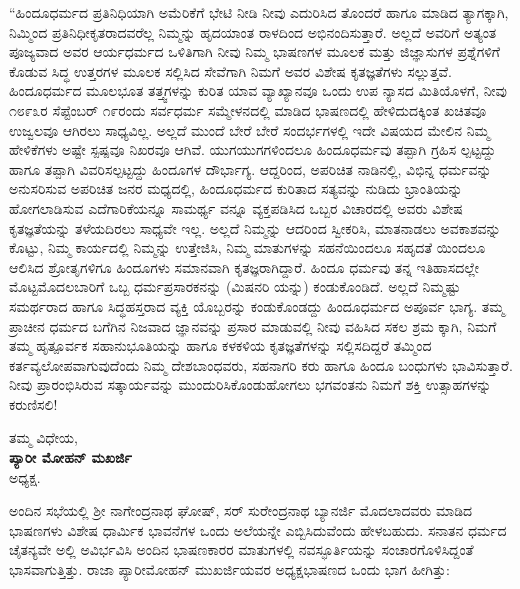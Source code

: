 “ಹಿಂದೂಧರ್ಮದ ಪ್ರತಿನಿಧಿಯಾಗಿ ಅಮೆರಿಕೆಗೆ ಭೇಟಿ ನೀಡಿ ನೀವು ಎದುರಿಸಿದ ತೊಂದರೆ ಹಾಗೂ ಮಾಡಿದ ತ್ಯಾಗಕ್ಕಾಗಿ, ನಿಮ್ಮಿಂದ ಪ್ರತಿನಿಧೀಕೃತರಾದವರೆಲ್ಲ ನಿಮ್ಮನ್ನು ಹೃದಯಾಂತ ರಾಳದಿಂದ ಅಭಿನಂದಿಸುತ್ತಾರೆ. ಅಲ್ಲದೆ ಅವರಿಗೆ ಅತ್ಯಂತ ಪೂಜ್ಯವಾದ ಅವರ ಆರ್ಯಧರ್ಮದ ಒಳಿತಿಗಾಗಿ ನೀವು ನಿಮ್ಮ ಭಾಷಣಗಳ ಮೂಲಕ ಮತ್ತು ಜಿಜ್ಞಾಸುಗಳ ಪ್ರಶ್ನೆಗಳಿಗೆ ಕೊಡುವ ಸಿದ್ಧ ಉತ್ತರಗಳ ಮೂಲಕ ಸಲ್ಲಿಸಿದ ಸೇವೆಗಾಗಿ ನಿಮಗೆ ಅವರ ವಿಶೇಷ ಕೃತಜ್ಞತೆಗಳು ಸಲ್ಲುತ್ತವೆ. ಹಿಂದೂಧರ್ಮದ ಮೂಲಭೂತ ತತ್ತ್ವಗಳನ್ನು ಕುರಿತ ಯಾವ ವ್ಯಾಖ್ಯಾನವೂ ಒಂದು ಉಪ ನ್ಯಾಸದ ಮಿತಿಯೊಳಗೆ, ನೀವು ೧೮೯೩ರ ಸೆಪ್ಟೆಂಬರ್ ೧೯ರಂದು ಸರ್ವಧರ್ಮ ಸಮ್ಮೇಳನದಲ್ಲಿ ಮಾಡಿದ ಭಾಷಣದಲ್ಲಿ ಹೇಳಿದುದಕ್ಕಿಂತ ಖಚಿತವೂ ಉಜ್ವಲವೂ ಆಗಿರಲು ಸಾಧ್ಯವಿಲ್ಲ. ಅಲ್ಲದೆ ಮುಂದೆ ಬೇರೆ ಬೇರೆ ಸಂದರ್ಭಗಳಲ್ಲಿ ಇದೇ ವಿಷಯದ ಮೇಲಿನ ನಿಮ್ಮ ಹೇಳಿಕೆಗಳು ಅಷ್ಟೇ ಸ್ಪಷ್ಪವೂ ನಿಖರವೂ ಆಗಿವೆ. ಯುಗಯುಗಗಳಿಂದಲೂ ಹಿಂದೂಧರ್ಮವು ತಪ್ಪಾಗಿ ಗ್ರಹಿಸ ಲ್ಪಟ್ಟದ್ದು ಹಾಗೂ ತಪ್ಪಾಗಿ ವಿವರಿಸಲ್ಪಟ್ಟದ್ದು ಹಿಂದೂಗಳ ದೌರ್ಭಾಗ್ಯ. ಆದ್ದರಿಂದ, ಅಪರಿಚಿತ ನಾಡಿನಲ್ಲಿ, ವಿಭಿನ್ನ ಧರ್ಮವನ್ನು ಅನುಸರಿಸುವ ಅಪರಿಚಿತ ಜನರ ಮಧ್ಯದಲ್ಲಿ, ಹಿಂದೂಧರ್ಮದ ಕುರಿತಾದ ಸತ್ಯವನ್ನು ನುಡಿದು ಭ್ರಾಂತಿಯನ್ನು ಹೋಗಲಾಡಿಸುವ ಎದೆಗಾರಿಕೆಯನ್ನೂ ಸಾಮರ್ಥ್ಯ ವನ್ನೂ ವ್ಯಕ್ತಪಡಿಸಿದ ಒಬ್ಬರ ವಿಚಾರದಲ್ಲಿ ಅವರು ವಿಶೇಷ ಕೃತಜ್ಞತೆಯನ್ನು ತಳೆಯದಿರಲು ಸಾಧ್ಯವೇ ಇಲ್ಲ. ಅಲ್ಲದೆ ನಿಮ್ಮನ್ನು ಆದರಿಂದ ಸ್ವೀಕರಿಸಿ, ಮಾತನಾಡಲು ಅವಕಾಶವನ್ನು ಕೊಟ್ಟು, ನಿಮ್ಮ ಕಾರ್ಯದಲ್ಲಿ ನಿಮ್ಮನ್ನು ಉತ್ತೇಜಿಸಿ, ನಿಮ್ಮ ಮಾತುಗಳನ್ನು ಸಹನೆಯಿಂದಲೂ ಸಹೃದತೆ ಯಿಂದಲೂ ಆಲಿಸಿದ ಶ್ರೋತೃಗಳಿಗೂ ಹಿಂದೂಗಳು ಸಮಾನವಾಗಿ ಕೃತಜ್ಞರಾಗಿದ್ದಾರೆ. ಹಿಂದೂ ಧರ್ಮವು ತನ್ನ ಇತಿಹಾಸದಲ್ಲೇ ಮೊಟ್ಟಮೊದಲಬಾರಿಗೆ ಒಬ್ಬ ಧರ್ಮಪ್ರಸಾರಕನನ್ನು (ಮಿಷನರಿ ಯನ್ನು) ಕಂಡುಕೊಂಡಿದೆ. ಅಲ್ಲದೆ ನಿಮ್ಮಷ್ಟು ಸಮರ್ಥರಾದ ಹಾಗೂ ಸಿದ್ಧಹಸ್ತರಾದ ವ್ಯಕ್ತಿ ಯೊಬ್ಬರನ್ನು ಕಂಡುಕೊಂಡದ್ದು ಹಿಂದೂಧರ್ಮದ ಅಪೂರ್ವ ಭಾಗ್ಯ. ತಮ್ಮ ಪ್ರಾಚೀನ ಧರ್ಮದ ಬಗೆಗಿನ ನಿಜವಾದ ಜ್ಞಾನವನ್ನು ಪ್ರಸಾರ ಮಾಡುವಲ್ಲಿ ನೀವು ವಹಿಸಿದ ಸಕಲ ಶ್ರಮ ಕ್ಕಾಗಿ, ನಿಮಗೆ ತಮ್ಮ ಹೃತ್ಪೂರ್ವಕ ಸಹಾನುಭೂತಿಯನ್ನು ಹಾಗೂ ಕಳಕಳಿಯ ಕೃತಜ್ಞತೆಗಳನ್ನು ಸಲ್ಲಿಸದಿದ್ದರೆ ತಮ್ಮಿಂದ ಕರ್ತವ್ಯಲೋಪವಾಗುವುದೆಂದು ನಿಮ್ಮ ದೇಶಬಾಂಧವರು, ಸಹನಾಗರಿ ಕರು ಹಾಗೂ ಹಿಂದೂ ಬಂಧುಗಳು ಭಾವಿಸುತ್ತಾರೆ. ನೀವು ಪ್ರಾರಂಭಿಸಿರುವ ಸತ್ಕಾರ್ಯವನ್ನು ಮುಂದುರಿಸಿಕೊಂಡುಹೋಗಲು ಭಗವಂತನು ನಿಮಗೆ ಶಕ್ತಿ ಉತ್ಸಾಹಗಳನ್ನು ಕರುಣಿಸಲಿ!

\begin{flushright}
ತಮ್ಮ ವಿಧೇಯ,\\\textbf{ಪ್ಯಾರೀ ಮೋಹನ್ ಮಖರ್ಜಿ}\\ಅಧ್ಯಕ್ಷ.
\end{flushright}

ಅಂದಿನ ಸಭೆಯಲ್ಲಿ ಶ್ರೀ ನಾಗೇಂದ್ರನಾಥ ಘೋಷ್, ಸರ್ ಸುರೇಂದ್ರನಾಥ ಬ್ಯಾನರ್ಜಿ ಮೊದಲಾದವರು ಮಾಡಿದ ಭಾಷಣಗಳು ವಿಶೇಷ ಧಾರ್ಮಿಕ ಭಾವನೆಗಳ ಒಂದು ಅಲೆಯನ್ನೇ ಎಬ್ಬಿಸಿದುವೆಂದು ಹೇಳಬಹುದು. ಸನಾತನ ಧರ್ಮದ ಚೈತನ್ಯವೇ ಅಲ್ಲಿ ಅವಿರ್ಭವಿಸಿ ಅಂದಿನ ಭಾಷಣಕಾರರ ಮಾತುಗಳಲ್ಲಿ ನವಸ್ಫೂರ್ತಿಯನ್ನು ಸಂಚಾರಗೊಳಿಸಿದ್ದಂತೆ ಭಾಸವಾಗುತ್ತಿತ್ತು. ರಾಜಾ ಪ್ಯಾರೀಮೋಹನ್ ಮುಖರ್ಜಿಯವರ ಅಧ್ಯಕ್ಷಭಾಷಣದ ಒಂದು ಭಾಗ ಹೀಗಿತ್ತು:


